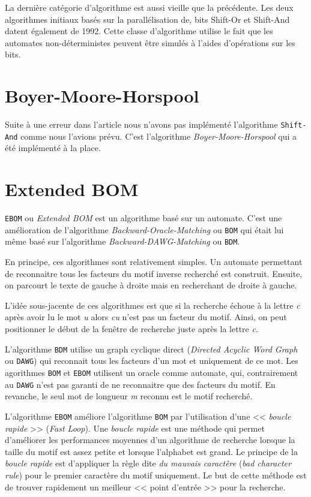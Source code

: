 \documentclass[a4paper,11pt]{article}
\begin{document}
La dernière catégorie d'algorithme est aussi vieille que la précédente. Les deux algorithmes initiaux basés sur la parallélisation de, bits Shift-Or et Shift-And datent également de 1992. Cette classe d'algorithme utilise le fait que les automates non-déterministes peuvent être simulés à l'aides d'opérations sur les bits.

\section{Boyer-Moore-Horspool}

Suite à une erreur dans l'article\cite{exact_string_matching_problem} nous n'avons pas implémenté l'algorithme \texttt{Shift-And} comme nous l'avions prévu. C'est l'algorithme \emph{Boyer-Moore-Horspool} qui a été implémenté à la place.

\section{Extended BOM}

\texttt{EBOM} ou \emph{Extended BOM} est un algorithme basé sur un automate. C'est une amélioration de l'algorithme \emph{Backward-Oracle-Matching} ou \texttt{BOM} qui était lui même basé sur l'algorithme \emph{Backward-DAWG-Matching} ou \texttt{BDM}.

En principe, ces algorithmes sont relativement simples. Un automate permettant de reconnaitre tous les facteurs du motif inverse recherché est construit. Ensuite, on parcourt le texte de gauche à droite mais en recherchant de droite à gauche.

L'idée sous-jacente de ces algorithmes est que si la recherche échoue à la lettre \emph{c} après avoir lu le mot \emph{u} alors \emph{cu} n'est pas un facteur du motif. Ainsi, on peut positionner le début de la fenêtre de recherche juste après la lettre \emph{c}.

L'algorithme \texttt{BDM} utilise un graph cyclique direct (\emph{Directed Acyclic Word Graph} ou \texttt{DAWG}) qui reconnait tous les facteurs d'un mot et uniquement de ce mot. Les agorithmes \texttt{BOM} et \texttt{EBOM} utilisent un oracle comme automate, qui, contrairement au \texttt{DAWG} n'est pas garanti de ne reconnaitre que des facteurs du motif. En revanche, le seul mot de longueur \emph{m} reconnu est le motif recherché.

L'algorithme \texttt{EBOM} améliore l'algorithme \texttt{BOM} par l'utilisation d'une << \emph{boucle rapide} >> (\emph{Fast Loop}). Une \emph{boucle rapide} est une méthode qui permet d'améliorer les performances moyennes d'un algorithme de recherche lorsque la taille du motif est assez petite et lorsque l'alphabet est grand. Le principe de la \emph{boucle rapide} est d'appliquer la règle dite \emph{du mauvais caractère} (\emph{bad character rule}) pour le premier caractère du motif uniquement. Le but de cette méthode est de trouver rapidement un meilleur << point d'entrée >> pour la recherche.
\end{document}
